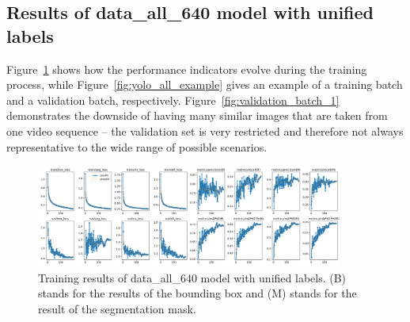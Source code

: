 \documentclass[Master,MDS,english]{BASE/twbook} %
\begin{document}
\subsection{Results of data\_all\_640 model with unified labels}

Figure~\ref{fig:training_all} shows how the performance indicators evolve during the training process, while Figure~\ref{fig:yolo_all_example} gives an example of a training batch and a validation batch, respectively.
Figure~\ref{fig:validation_batch_1} demonstrates the downside of having many similar images that are taken from one video sequence -- the validation set is very restricted and therefore not always representative to the wide range of possible scenarios.


\begin{figure}[H]
\centering
\includegraphics[width=0.9\textwidth]{images/yolo/all/results}
\caption{Training results of data\_all\_640 model with unified labels. (B) stands for the results of the bounding box and (M) stands for the result of the segmentation mask.}
\label{fig:training_all}
\end{figure}
\end{document}
